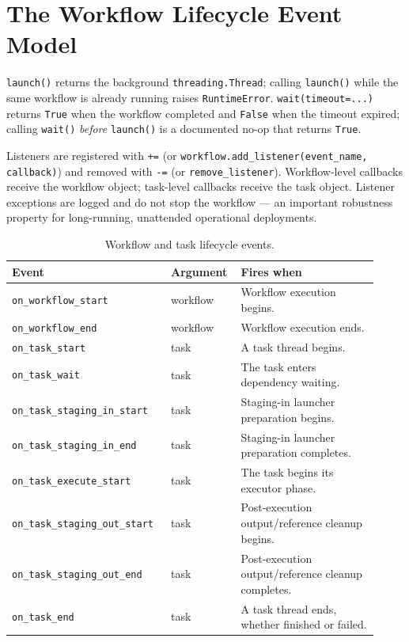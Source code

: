 \section{The Workflow Lifecycle Event Model}

\texttt{launch()} returns the background \texttt{threading.Thread}; calling
\texttt{launch()} while the same workflow is already running raises
\texttt{RuntimeError}. \texttt{wait(timeout=...)} returns \texttt{True} when
the workflow completed and \texttt{False} when the timeout expired; calling
\texttt{wait()} \emph{before} \texttt{launch()} is a documented no-op that
returns \texttt{True}.

Listeners are registered with \texttt{+=} (or
\texttt{workflow.add\_listener(event\_name, callback)}) and removed with
\texttt{-=} (or \texttt{remove\_listener}). Workflow-level callbacks receive
the workflow object; task-level callbacks receive the task object. Listener
exceptions are logged and do not stop the workflow --- an important
robustness property for long-running, unattended operational deployments.

\begin{table}[h]
\centering
\caption{Workflow and task lifecycle events.}
\label{tab:lifecycle-events}
\begin{tabular}{@{}p{0.40\linewidth}p{0.16\linewidth}p{0.36\linewidth}@{}}
\toprule
\textbf{Event} & \textbf{Argument} & \textbf{Fires when} \\
\midrule
\texttt{on\_workflow\_start} & workflow & Workflow execution begins. \\
\texttt{on\_workflow\_end} & workflow & Workflow execution ends. \\
\texttt{on\_task\_start} & task & A task thread begins. \\
\texttt{on\_task\_wait} & task & The task enters dependency waiting. \\
\texttt{on\_task\_staging\_in\_start} & task & Staging-in launcher preparation begins. \\
\texttt{on\_task\_staging\_in\_end} & task & Staging-in launcher preparation completes. \\
\texttt{on\_task\_execute\_start} & task & The task begins its executor phase. \\
\texttt{on\_task\_staging\_out\_start} & task & Post-execution output/reference cleanup begins. \\
\texttt{on\_task\_staging\_out\_end} & task & Post-execution output/reference cleanup completes. \\
\texttt{on\_task\_end} & task & A task thread ends, whether finished or failed. \\
\bottomrule
\end{tabular}
\end{table}

